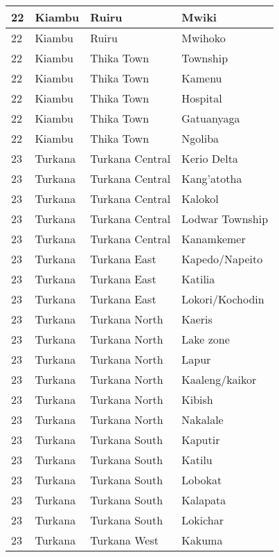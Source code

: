 \begin{table}[!ht]
\begin{tabular}{|l|l|l|l|}
        22 & Kiambu & Ruiru & Mwiki \\ \hline
        22 & Kiambu & Ruiru & Mwihoko \\ \hline
        22 & Kiambu & Thika Town & Township \\ \hline
        22 & Kiambu & Thika Town & Kamenu \\ \hline
        22 & Kiambu & Thika Town & Hospital \\ \hline
        22 & Kiambu & Thika Town & Gatuanyaga \\ \hline
        22 & Kiambu & Thika Town & Ngoliba \\ \hline
        23 & Turkana & Turkana Central & Kerio Delta \\ \hline
        23 & Turkana & Turkana Central & Kang’atotha \\ \hline
        23 & Turkana & Turkana Central & Kalokol \\ \hline
        23 & Turkana & Turkana Central & Lodwar Township \\ \hline
        23 & Turkana & Turkana Central & Kanamkemer \\ \hline
        23 & Turkana & Turkana East & Kapedo/Napeito \\ \hline
        23 & Turkana & Turkana East & Katilia \\ \hline
        23 & Turkana & Turkana East & Lokori/Kochodin \\ \hline
        23 & Turkana & Turkana North & Kaeris \\ \hline
        23 & Turkana & Turkana North & Lake zone \\ \hline
        23 & Turkana & Turkana North & Lapur \\ \hline
        23 & Turkana & Turkana North & Kaaleng/kaikor \\ \hline
        23 & Turkana & Turkana North & Kibish \\ \hline
        23 & Turkana & Turkana North & Nakalale \\ \hline
        23 & Turkana & Turkana South & Kaputir \\ \hline
        23 & Turkana & Turkana South & Katilu \\ \hline
        23 & Turkana & Turkana South & Lobokat \\ \hline
        23 & Turkana & Turkana South & Kalapata \\ \hline
        23 & Turkana & Turkana South & Lokichar \\ \hline
        23 & Turkana & Turkana West & Kakuma \\ \hline

\end{tabular}
\end{table}
